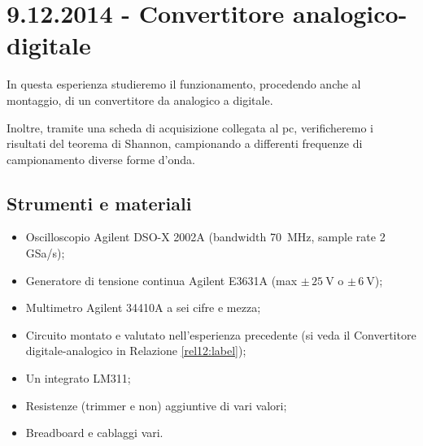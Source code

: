 \section{9.12.2014 - Convertitore analogico-digitale}

In questa esperienza studieremo il funzionamento, procedendo anche al montaggio, di un convertitore da analogico a digitale.

Inoltre, tramite una scheda di acquisizione collegata al pc, verificheremo i risultati del teorema di Shannon, campionando a differenti frequenze di campionamento diverse forme d'onda.

\subsection*{Strumenti e materiali}

\begin{itemize} [noitemsep]
	\item Oscilloscopio Agilent DSO-X 2002A (bandwidth \SI{70}{\mega\hertz}, sample rate \num{2} GSa/s);
	\item Generatore di tensione continua Agilent E3631A (max $\pm \, \SI{25}{\volt}$ o $\pm \, \SI{6}{\volt}$);
	\item Multimetro Agilent 34410A a sei cifre e mezza;
	\item Circuito montato e valutato nell'esperienza precedente (si veda il Convertitore digitale-analogico in Relazione \ref{rel12:label});
\item Un integrato LM311;	
\item Resistenze (trimmer e non) aggiuntive di vari valori;
\item Breadboard e cablaggi vari.
\end{itemize}
